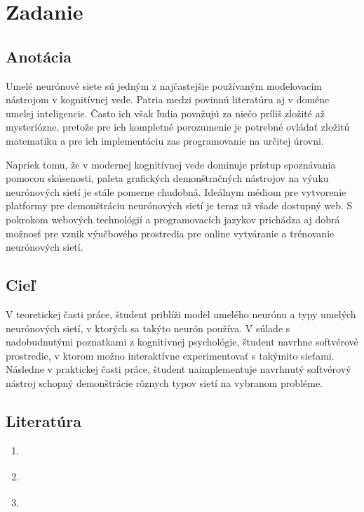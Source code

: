 \chapter{Zadanie}

\section*{Anotácia}
Umelé neurónové siete sú jedným z najčastejšie používaným modelovacím nástrojom v kognitívnej vede. Patria medzi povinnú literatúru aj v doméne umelej inteligencie. Často ich však ľudia považujú za niečo príliš zložité až mysteriózne, pretože pre ich kompletné porozumenie je potrebné ovládať zložitú matematiku a pre ich implementáciu zas programovanie na určitej úrovni.

Napriek tomu, že v modernej kognitívnej vede dominuje prístup spoznávania pomocou skúsenosti, paleta grafických demonštračných nástrojov na výuku neurónových sietí je stále pomerne chudobná. Ideálnym médiom pre vytvorenie platformy pre demonštráciu neurónových sietí je teraz už všade dostupný web. S pokrokom webových technológií a programovacích jazykov prichádza aj dobrá možnosť pre vznik výučbového prostredia pre online vytváranie a trénovanie neurónových sietí.

\section*{Cieľ}
V teoretickej časti práce, študent priblíži model umelého neurónu a typy umelých neurónových sietí, v ktorých sa takýto neurón používa. V súlade s nadobudnutými poznatkami z kognitívnej psychológie, študent navrhne softvérové prostredie, v ktorom možno interaktívne experimentovať s takýmito sieťami. Následne v praktickej časti práce, študent naimplementuje navrhnutý softvérový nástroj schopný demonštrácie rôznych typov sietí na vybranom probléme.

\section*{Literatúra}

\begin{enumerate}
  \item \cite{Rojas96}
  \item \cite{Johnson2010}
  \item \cite{Victor2013}
\end{enumerate}